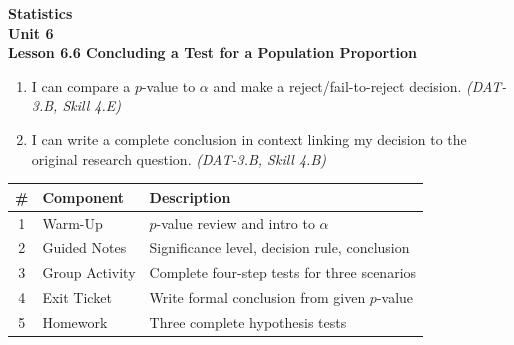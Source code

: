 \documentclass[10pt]{article}
\begin{document}
\vspace{-0.8in}

\begin{center}
  {\color{white}\textbf{\LARGE Statistics}}\\[4pt]
  {\color{skymid}\large\textbf{Unit 6}}\\[6pt]
  {\color{white}\textbf{\large Lesson 6.6 \quad Concluding a Test for a Population Proportion}}
\end{center}

\vspace{0.22in}
\namedateperiod
\vspace{0.18in}

\begin{learningtargetbox}
\small
\begin{enumerate}[leftmargin=1.5em, itemsep=5pt]
  \item I can compare a $p$-value to $\alpha$ and make a reject/fail-to-reject decision. \textit{(DAT-3.B, Skill 4.E)}
  \item I can write a complete conclusion in context linking my decision to the original research question. \textit{(DAT-3.B, Skill 4.B)}
\end{enumerate}
\end{learningtargetbox}

\vspace{0.14in}

\begin{tocbox}
\small
\renewcommand{\arraystretch}{1.5}
\begin{tabularx}{\linewidth}{@{} c l X @{}}
\rowcolor{sky}
\textbf{\#} & \textbf{Component} & \textbf{Description} \\
\midrule
1 & Warm-Up        & $p$-value review and intro to $\alpha$ \\
2 & Guided Notes   & Significance level, decision rule, conclusion \\
3 & Group Activity & Complete four-step tests for three scenarios \\
4 & Exit Ticket    & Write formal conclusion from given $p$-value \\
5 & Homework       & Three complete hypothesis tests \\
\end{tabularx}
\end{tocbox}
\end{document}
